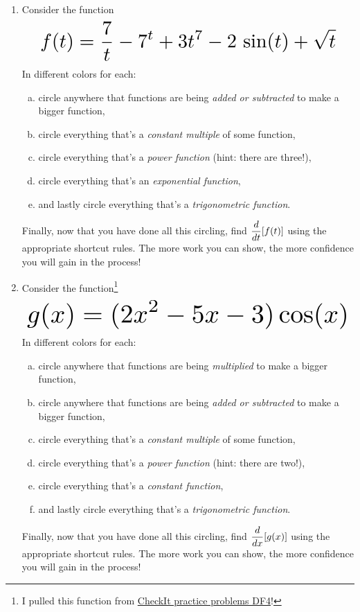 \begin{enumerate}[leftmargin=15pt]
    \item Consider the function 
    \[\scaleto{f(t) = \frac{7}{t} - 7^t + 3t^7 - 2\, \sin(t)+ \sqrt{t}}{40 pt} \]
    In different colors for each:
    \begin{enumerate}[(a), leftmargin=15pt]
        \item circle anywhere that functions are being \textit{added or subtracted} to make a bigger function,
        \item circle everything that's a \textit{constant multiple} of some function,
        \item circle everything that's a \textit{power function} (hint: there are three!),
        \item circle everything that's an \textit{exponential function},
        \item and lastly circle everything that's a \textit{trigonometric function}.
    \end{enumerate}
    Finally, now that you have done all this circling, find $\displaystyle\frac{d}{dt} [f(t)]$ using the appropriate shortcut rules. The more work you can show, the more confidence you will gain in the process!
    \pagebreak

    \renewcommand*{\thefootnote}{\fnsymbol{footnote}}

    \item Consider the function\footnote{I pulled this function from \href{https://library.tbil.org/2025/calculus/exercises/\#/bank/DF4/1/}{CheckIt practice problems DF4}!} 
    \[\scaleto{g(x) = (2x^2 - 5x - 3) \cos(x)}{30 pt} \]
    In different colors for each:
    \begin{enumerate}[(a), leftmargin=15pt]
        \item circle anywhere that functions are being \textit{multiplied} to make a bigger function,
        \item circle anywhere that functions are being \textit{added or subtracted} to make a bigger function,
        \item circle everything that's a \textit{constant multiple} of some function,
        \item circle everything that's a \textit{power function} (hint: there are two!),
        \item circle everything that's a \textit{constant function},
        \item and lastly circle everything that's a \textit{trigonometric function}.
    \end{enumerate}
    Finally, now that you have done all this circling, find $\displaystyle\frac{d}{dx} [g(x)]$ using the appropriate shortcut rules. The more work you can show, the more confidence you will gain in the process!
    \vfill


\end{enumerate}
